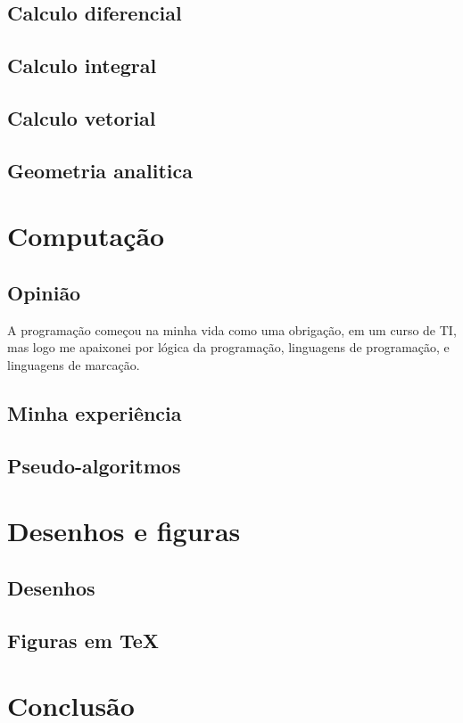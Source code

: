 \documentclass{article}
\begin{document}
    \subsection{Calculo diferencial}
    \subsection{Calculo integral}
    \subsection{Calculo vetorial}
    \subsection{Geometria analitica}

    \section{Computação}
    \subsection{Opinião}
    A programação começou na minha vida como uma obrigação, em um curso de TI, mas logo me apaixonei por lógica da programação, linguagens de programação, e linguagens de marcação.
    \subsection{Minha experiência}
    \subsection{Pseudo-algoritmos}

    \section{Desenhos e figuras}
    \subsection{Desenhos}
    \subsection{Figuras em \TeX}

    \section{Conclusão}

    \medskip

    
    
    
\end{document}
